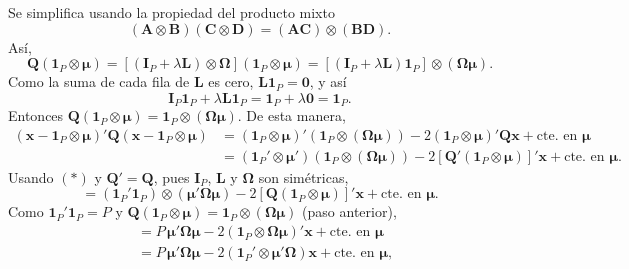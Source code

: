 \documentclass[11pt,a4paper]{article}
\begin{document}
Se simplifica usando la propiedad del producto mixto
\begin{equation*}
(\mathbf{A}\otimes\mathbf{B})(\mathbf{C}\otimes\mathbf{D}) = (\mathbf{A}\mathbf{C})\otimes(\mathbf{B}\mathbf{D}). \tag{$*$}
\end{equation*}
Así,
\[
\mathbf{Q}(\boldsymbol{1}_P \otimes \boldsymbol{\mu}) = \left[(\mathbf{I}_P + \lambda\mathbf{L}) \otimes \mathbf{\Omega}\right](\boldsymbol{1}_P \otimes \boldsymbol{\mu}) = \left[(\mathbf{I}_P + \lambda\mathbf{L})\boldsymbol{1}_P\right] \otimes (\mathbf{\Omega}\boldsymbol{\mu}).
\]
Como la suma de cada fila de $\mathbf{L}$ es cero, $\mathbf{L}\boldsymbol{1}_P = \boldsymbol{0}$, y así
\[
\mathbf{I}_P\boldsymbol{1}_P + \lambda\mathbf{L}\boldsymbol{1}_P = \boldsymbol{1}_P + \lambda\boldsymbol{0} = \boldsymbol{1}_P.
\]
Entonces $\mathbf{Q}(\boldsymbol{1}_P \otimes \boldsymbol{\mu}) = \boldsymbol{1}_P \otimes (\mathbf{\Omega}\boldsymbol{\mu})$. De esta manera,
\begin{align*}
(\boldsymbol{x} - \boldsymbol{1}_P \otimes \boldsymbol{\mu})' \mathbf{Q} (\boldsymbol{x} - \boldsymbol{1}_P \otimes \boldsymbol{\mu})
&= (\boldsymbol{1}_P \otimes \boldsymbol{\mu})'\left(\boldsymbol{1}_P \otimes (\mathbf{\Omega}\boldsymbol{\mu})\right) - 2(\boldsymbol{1}_P \otimes \boldsymbol{\mu})'\mathbf{Q}\boldsymbol{x} + \text{cte. en }\boldsymbol{\mu} \\
&= (\boldsymbol{1}_P' \otimes \boldsymbol{\mu}')\left(\boldsymbol{1}_P \otimes (\mathbf{\Omega}\boldsymbol{\mu})\right) - 2\left[\mathbf{Q}'(\boldsymbol{1}_P \otimes \boldsymbol{\mu})\right]'\boldsymbol{x} + \text{cte. en }\boldsymbol{\mu}.
\end{align*}
Usando $(*)$ y $\mathbf{Q}' = \mathbf{Q}$, pues $\mathbf{I}_P$, $\mathbf{L}$ y $\mathbf{\Omega}$ son simétricas,
\[
= (\boldsymbol{1}_P'\boldsymbol{1}_P) \otimes (\boldsymbol{\mu}'\mathbf{\Omega}\boldsymbol{\mu}) - 2\left[\mathbf{Q}(\boldsymbol{1}_P \otimes \boldsymbol{\mu})\right]'\boldsymbol{x} + \text{cte. en }\boldsymbol{\mu}.
\]
Como $\boldsymbol{1}_P'\boldsymbol{1}_P = P$ y $\mathbf{Q}(\boldsymbol{1}_P \otimes \boldsymbol{\mu}) = \boldsymbol{1}_P \otimes (\mathbf{\Omega}\boldsymbol{\mu})$ (paso anterior),
\begin{align*}
&= P\,\boldsymbol{\mu}'\mathbf{\Omega}\boldsymbol{\mu} - 2\left(\boldsymbol{1}_P \otimes \mathbf{\Omega}\boldsymbol{\mu}\right)'\boldsymbol{x} + \text{cte. en }\boldsymbol{\mu} \\
&= P\,\boldsymbol{\mu}'\mathbf{\Omega}\boldsymbol{\mu} - 2\left(\boldsymbol{1}_P' \otimes \boldsymbol{\mu}'\mathbf{\Omega}\right)\boldsymbol{x} + \text{cte. en }\boldsymbol{\mu},
\end{align*}
\end{document}

